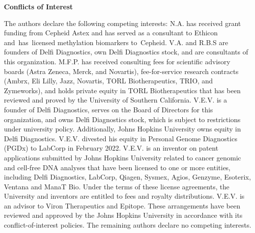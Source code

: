 \vspace{1em}
\noindent \textbf{Conflicts of Interest}

\noindent The authors declare the following competing interests: N.A. has received grant funding from Cepheid Astex and has served as a consultant to Ethicon and has licensed methylation biomarkers to Cepheid. V.A. and R.B.S are founders of Delfi Diagnostics, own Delfi Diagnostics stock, and are consultants of this organization.
M.F.P. has received consulting fees for scientific advisory boards (Astra Zeneca, Merck, and Novartis), fee-for-service research contracts (Ambrx, Eli Lilly, Jazz, Novartis, TORL Biotherapeutics, TRIO, and Zymeworks), and holds private equity in TORL Biotherapeutics that has been reviewed and proved by the University of Southern California.
V.E.V. is a founder of Delfi Diagnostics, serves on the Board of Directors for this organization, and owns Delfi Diagnostics stock, which is subject to restrictions under university policy. Additionally, Johns Hopkins University owns equity in Delfi Diagnostics.
V.E.V. divested his equity in Personal Genome Diagnostics (PGDx) to LabCorp in February 2022.
V.E.V. is an inventor on patent applications submitted by Johns Hopkins University related to cancer genomic and cell-free DNA analyses that have been licensed to one or more entities, including Delfi Diagnostics, LabCorp, Qiagen, Sysmex, Agios, Genzyme, Esoterix, Ventana and ManaT Bio. Under the terms of these license agreements, the University and inventors are entitled to fees and royalty distributions. V.E.V. is an advisor to Viron Therapeutics and Epitope. These arrangements have been reviewed and approved by the Johns Hopkins University in accordance with its conflict-of-interest policies. The remaining authors declare no competing interests.
